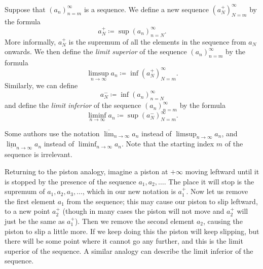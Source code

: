 \begin{definition}\label{6.4.6}
    Suppose that \((a_n)_{n = m}^\infty\) is a sequence.
    We define a new sequence \((a_N^+)_{N = m}^\infty\) by the formula
    \[
        a_N^+ \coloneqq \sup(a_n)_{n = N}^\infty.
    \]
    More informally, \(a_N^+\) is the supremum of all the elements in the sequence from \(a_N\) onwards.
    We then define the \emph{limit superior} of the sequence \((a_n)_{n = m}^\infty\) by the formula
    \[
        \limsup_{n \to \infty} a_n \coloneqq \inf(a_N^+)_{N = m}^\infty.
    \]
    Similarly, we can define
    \[
        a_N^- \coloneqq \inf(a_n)_{n = N}^\infty
    \]
    and define the \emph{limit inferior} of the sequence \((a_n)_{n = m}^\infty\) by the formula
    \[
        \liminf_{n \to \infty} a_n \coloneqq \sup(a_N^-)_{N = m}^\infty.
    \]
\end{definition}

\setcounter{theorem}{10}
\begin{remark}\label{6.4.11}
    Some authors use the notation \(\overline{\lim}_{n \to \infty} a_n\) instead of \(\limsup_{n \to \infty} a_n\), and \(\underline{\lim}_{n \to \infty} a_n\) instead of \(\liminf_{n \to \infty} a_n\).
    Note that the starting index \(m\) of the sequence is irrelevant.
\end{remark}

\begin{note}
    Returning to the piston analogy, imagine a piston at \(+\infty\) moving leftward until it is stopped by the presence of the sequence \(a_1, a_2, \dots\).
    The place it will stop is the supremum of \(a_1, a_2, a_3, \dots\), which in our new notation is \(a_1^+\).
    Now let us remove the first element \(a_1\) from the sequence;
    this may cause our piston to slip leftward, to a new point \(a_2^+\)
    (though in many cases the piston will not move and \(a_2^+\) will just be the same as \(a_1^+\)).
    Then we remove the second element \(a_2\), causing the piston to slip a little more.
    If we keep doing this the piston will keep slipping, but there will be some point where it cannot go any further, and this is the limit superior of the sequence.
    A similar analogy can describe the limit inferior of the sequence.
\end{note}

